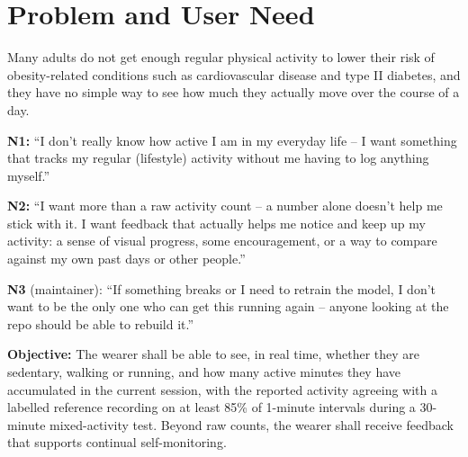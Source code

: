 \section{Problem and User Need}
\label{sec:need}

Many adults do not get enough regular physical activity to lower
their risk of obesity-related conditions such as cardiovascular
disease and type II diabetes, and they have no simple way to see
how much they actually move over the course of a day.

\textbf{N1:} ``I don't really know how active I am in my everyday
life -- I want something that tracks my regular (lifestyle)
activity without me having to log anything myself.''

\textbf{N2:} ``I want more than a raw activity count -- a number
alone doesn't help me stick with it. I want feedback that
actually helps me notice and keep up my activity: a sense of
visual progress, some encouragement, or a way to compare against
my own past days or other people.''

\textbf{N3} (maintainer): ``If something breaks or I need to
retrain the model, I don't want to be the only one who can get
this running again -- anyone looking at the repo should be able
to rebuild it.''

\textbf{Objective:} The wearer shall be able to see, in real time,
whether they are sedentary, walking or running, and how many
active minutes they have accumulated in the current session, with
the reported activity agreeing with a labelled reference recording
on at least 85\% of 1-minute intervals during a 30-minute
mixed-activity test. Beyond raw counts, the wearer shall receive
feedback that supports continual self-monitoring.
